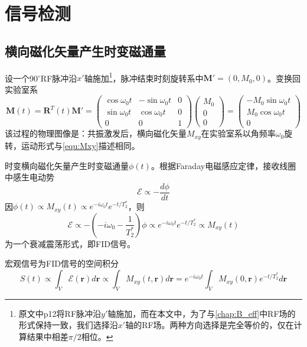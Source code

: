 \documentclass[12pt]{article}
\begin{document}
\section{信号检测}
\subsection{横向磁化矢量产生时变磁通量}
设一个90$^\circ$RF脉冲沿$x'$轴施加\footnote{原文中p12将RF脉冲沿$y'$轴施加，而在本文中，为了与\autoref{chap:B_eff}中RF场的形式保持一致，我们选择沿$x'$轴的RF场。两种方向选择是完全等价的，仅在计算结果中相差$\pi/2$相位。}，脉冲结束时刻旋转系中$\bm{M}'=(0,M_0,0)$。变换回实验室系
\begin{equation}
    \bm{M}(t)=\mathbf{R}^T(t)\bm{M}'=
    \begin{pmatrix}
        \cos\omega_0t & -\sin\omega_0t & 0 \\
        \sin\omega_0t & \cos\omega_0t & 0 \\
        0 & 0 & 1
    \end{pmatrix}
    \begin{pmatrix} M_0 \\ 0 \\ 0 \end{pmatrix}
    =\begin{pmatrix} -M_0\sin\omega_0t \\ M_0\cos\omega_0t \\ 0 \end{pmatrix}
\end{equation}
该过程的物理图像是：共振激发后，横向磁化矢量$M_{xy}$在实验室系以角频率$\omega_0$旋转，运动形式与\autoref{equ:Mxy}描述相同。

时变横向磁化矢量产生时变磁通量$\phi(t)$。根据Faraday电磁感应定律，接收线圈中感生电动势
\begin{equation}
    \mathcal{E}\propto-\frac{d\phi}{dt}
\end{equation}
因$\phi(t)\propto M_{xy}(t)\propto e^{-i\omega_0t}e^{-t/T_2^*}$，则
\begin{equation}
    \mathcal{E}\propto -\left(-i\omega_0-\frac{1}{T_2^*}\right)\phi\propto e^{-i\omega_0t}e^{-t/T_2^*}\propto M_{xy}(t)
\end{equation}
为一个衰减震荡形式，即FID信号。

宏观信号为FID信号的空间积分
\begin{equation}
    \boxed{S(t)\propto\int_{V} \mathcal{E}(\bm{r}) d\bm{r}\propto\int_{V} M_{xy}(t,\bm{r}) d\bm{r}=e^{-i\omega_0t}\int_{V} M_{xy}(0,\bm{r})e^{-t/T_2^*} d\bm{r}}
\end{equation}
\end{document}
